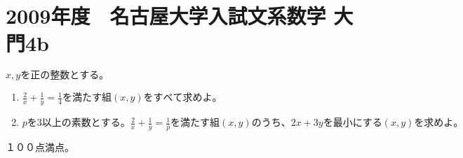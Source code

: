 \documentclass{jsarticle}
\begin{document}
\section*{2009年度　名古屋大学入試文系数学 大門4b}
$ x,yを正の整数とする。$
\begin{enumerate}[(1)]
\item $\frac{2}{x} + \frac{1}{y} = \frac{1}{4}　を満たす組(x,y)をすべて求めよ。$
\item $pを3以上の素数とする。\frac{2}{x} + \frac{1}{y} = \frac{1}{p} を満たす組(x,y)のうち、2x+3yを最小にする(x,y)を求めよ。$
\end{enumerate}



１００点満点。
\end{document}
